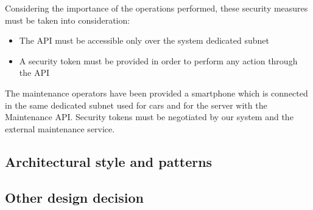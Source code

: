 Considering the importance of the operations performed, these security measures must be taken into consideration:
\begin{itemize}
	\item The API must be accessible only over the system dedicated subnet
	\item A security token must be provided in order to perform any action through the API
\end{itemize}
The maintenance operators have been provided a smartphone which is connected in the same dedicated subnet used for cars and for the server with the Maintenance API.
Security tokens must be negotiated by our system and the external maintenance service.

\subsection{Architectural style and patterns}
\subsection{Other design decision}
